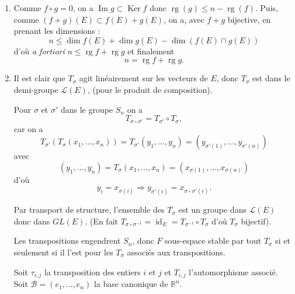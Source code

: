\begin{enumerate}[label=\arabic*.,leftmargin=2.2em,itemsep=1.1em]
\begin{enumerate}[label=\alph*),leftmargin=2em]
Pour relier au a) soit $i$ fixé et
\[
g_i=\sum_{\substack{k=1\\k\ne i}}^p f_k.
\]
On a
\[
g_i(E)\subset\bigoplus_{\substack{k=1\\k\ne i}}^p f_k(E)
\Rightarrow\operatorname{rg}(g_i)\le n-\operatorname{rg}(f_i).
\]
On a donc $f_i+g_i=\operatorname{id}_E$ et $\operatorname{rg}f_i+\operatorname{rg}g_i\le n\Rightarrow f_i$ est projecteur sur $f_i(E)$ parallèlement à $g_i(E)$.

De plus
\[
\dim g_i(E)=n-\dim f_i(E)=\dim\left(\bigoplus_{\substack{k=1\\k\ne i}}^p f_k(E)\right)
\]
donc
\[
g_i(E)=\bigoplus_{\substack{k=1\\k\ne i}}^p f_k(E).
\]
Mais alors si $j\ne i$, $f_j(x)\in g_i(E)\Rightarrow f_i(f_j(x))=0$ d'où les relations $f_i\circ f_j=0$.
\end{enumerate}

\item Comme $f\circ g=0$, on a $\operatorname{Im}g\subset\operatorname{Ker} f$ donc $\operatorname{rg}(g)\le n-\operatorname{rg}(f)$. Puis, comme $(f+g)(E)\subset f(E)+g(E)$, on a, avec $f+g$ bijective, en prenant les dimensions :
\[
n\le\dim f(E)+\dim g(E)-\dim(f(E)\cap g(E))
\]
d'où \emph{a fortiori} $n\le\operatorname{rg}f+\operatorname{rg}g$ et finalement
\[
n=\operatorname{rg}f+\operatorname{rg}g.
\]

\item Il est clair que $T_\sigma$ agit linéairement sur les vecteurs de $E$, donc $T_\sigma$ est dans le demi-groupe $\mathcal L(E)$, (pour le produit de composition).

Pour $\sigma$ et $\sigma'$ dans le groupe $S_n$ on a
\[
T_{\sigma\circ\sigma'}=T_{\sigma'}\circ T_\sigma,
\]
car on a
\[
T_{\sigma'}(T_\sigma(x_1,\ldots,x_n))=T_{\sigma'}(y_1,\ldots,y_n)=(y_{\sigma'(1)},\ldots,y_{\sigma'(n)})
\]
avec
\[
(y_1,\ldots,y_n)=T_\sigma(x_1,\ldots,x_n)=(x_{\sigma(1)},\ldots,x_{\sigma(n)})
\]
d'où
\[
y_i=x_{\sigma(i)}\Rightarrow y_{\sigma'(i)}=x_{\sigma\circ\sigma'(i)}.
\]

Par transport de structure, l'ensemble des $T_\sigma$ est un groupe dans $\mathcal L(E)$ donc dans $GL(E)$. (En fait $T_{\sigma\circ\sigma^{-1}}=\operatorname{id}_E=T_{\sigma^{-1}}\circ T_\sigma$ d'où $T_\sigma$ bijectif).

Les transpositions engendrent $S_n$, donc $F$ sous-espace stable par tout $T_\sigma$ si et seulement si il l'est pour les $T_\sigma$ associés aux transpositions.

Soit $\tau_{i,j}$ la transposition des entiers $i$ et $j$ et $T_{i,j}$ l'automorphisme associé. Soit $\mathcal B=(e_1,\ldots,e_n)$ la base canonique de $\mathbb R^n$.


\end{enumerate}

